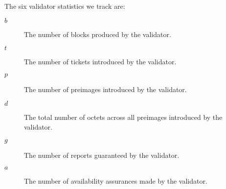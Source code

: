 The six validator statistics we track are:
\begin{description}
  \item[$b$] The number of blocks produced by the validator.
  \item[$t$] The number of tickets introduced by the validator.
  \item[$p$] The number of preimages introduced by the validator.
  \item[$d$] The total number of octets across all preimages introduced by the validator.
  \item[$g$] The number of reports guaranteed by the validator.
  \item[$a$] The number of availability assurances made by the validator.
\end{description}


